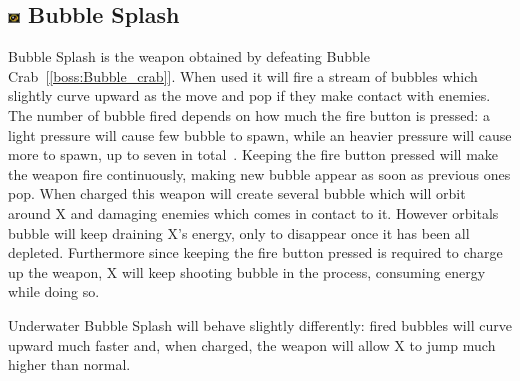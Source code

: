 \subsection{\includegraphics[width=12px, height=10px]{figures/X2/weapons/B_splash.png} Bubble Splash}\label{Bubble_splash}
Bubble Splash is the weapon obtained by defeating Bubble Crab~[\ref{boss:Bubble_crab}]. When used it will fire a stream of bubbles which slightly curve upward as the move and pop if they make contact with enemies.  The number of bubble fired depends on how much the fire button is pressed: a light pressure will cause few bubble to spawn, while an heavier pressure will cause more to spawn, up to seven in total~\cite{wiki:Bubble_splash}. Keeping the fire button pressed will make the weapon fire continuously, making new bubble appear as soon as previous ones pop. When charged this weapon will create several bubble which will orbit around X and damaging enemies which comes in contact to it. However orbitals bubble will keep draining X's energy, only to disappear once it has been all depleted. Furthermore since keeping the fire button pressed is required to charge up the weapon, X will keep shooting bubble in the process, consuming energy while doing so. 

Underwater Bubble Splash will behave slightly differently: fired bubbles will curve upward much faster and, when charged, the weapon will allow X to jump much higher than normal.

